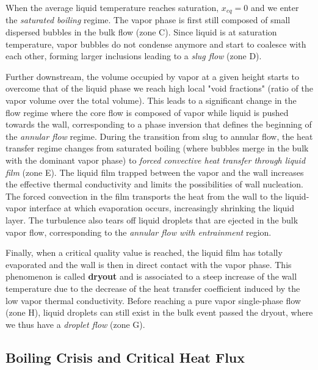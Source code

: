 \npar

When the average liquid temperature reaches saturation, $x_{eq} = 0 $ and we enter the \textit{saturated boiling} regime. The vapor phase is first still composed of small dispersed bubbles in the bulk flow (zone C). Since liquid is at saturation temperature, vapor bubbles do not condense anymore and start to coalesce with each other, forming larger inclusions leading to a \textit{slug flow} (zone D).

\npar

Further downstream, the volume occupied by vapor at a given height starts to overcome that of the liquid phase \ie we reach high local "void fractions" (ratio of the vapor volume over the total volume). This leads to a significant change in the flow regime where the core flow is composed of vapor while liquid is pushed towards the wall, corresponding to a phase inversion that defines the beginning of the \textit{annular flow} regime. During the transition from slug to annular flow, the heat transfer regime changes from saturated boiling (where bubbles merge in the bulk with the dominant vapor phase) to \textit{forced convective heat transfer through liquid film} (zone E). The liquid film trapped between the vapor and the wall increases the effective thermal conductivity and limits the possibilities of wall nucleation. The forced convection in the film transports the heat from the wall to the liquid-vapor interface at which evaporation occurs, increasingly shrinking the liquid layer. The turbulence also tears off liquid droplets that are ejected in the bulk vapor flow, corresponding to the \textit{annular flow with entrainment} region.

\npar

Finally, when a critical quality value is reached, the liquid film has totally evaporated and the wall is then in direct contact with the vapor phase. This phenomenon is called \textbf{dryout} and is associated to a steep increase of the wall temperature due to the decrease of the heat transfer coefficient induced by the low vapor thermal conductivity. Before reaching a pure vapor single-phase flow (zone H), liquid droplets can still exist in the bulk event passed the dryout, where we thus have a \textit{droplet flow} (zone G).


\subsection{Boiling Crisis and Critical Heat Flux}


